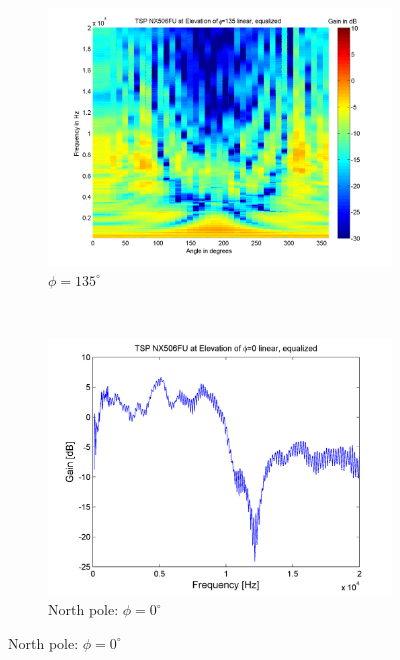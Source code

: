 \begin{figure}[t!]
        \begin{subfigure}[t]{0.5\textwidth}
			    \caption{$\phi=135^\circ$}
			    \label{fig:res_NX506_FU_135}
                \centering
    			\includegraphics[height=0.28\textheight]{afbeeldingen/plots/results/NX506FU_TSP_135_lin_eq.png}
        \end{subfigure}~
        \begin{subfigure}[t]{0.5\textwidth}
			    \caption{North pole: $\phi=0^\circ$}
			    \label{fig:res_NX506_FU_0}
                \centering
    			\includegraphics[height=0.28\textheight]{afbeeldingen/plots/results/NX506FU_north.png}
        \end{subfigure}
        

\end{figure}
